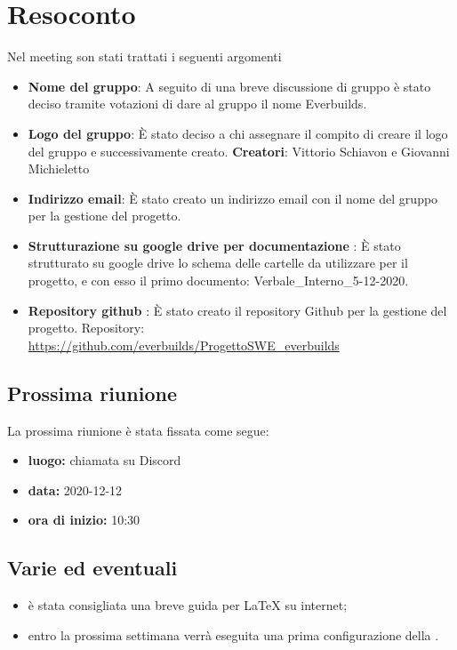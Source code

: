 \section{Resoconto}
Nel meeting son stati trattati i seguenti argomenti
	\begin{itemize}
		\item\textbf{Nome del gruppo}:
		A seguito di una breve discussione di gruppo è stato deciso tramite votazioni di dare al gruppo il nome Everbuilds.
		\item\textbf{Logo del gruppo}:
		È stato deciso a chi assegnare il compito di creare il logo del gruppo e successivamente creato.
		\textbf{Creatori}: Vittorio Schiavon e Giovanni Michieletto
		\item\textbf{ Indirizzo email}:
		È stato creato un indirizzo email con il nome del gruppo per la gestione del progetto.
		\item\textbf{ Strutturazione su google drive per documentazione }:
		È stato strutturato su google drive lo schema delle cartelle da utilizzare per il progetto, e con esso il primo documento: Verbale\_Interno\_5-12-2020.
		\item\textbf{ Repository github }:
		È stato creato il repository Github per la gestione del progetto.
		Repository: \url{https://github.com/everbuilds/ProgettoSWE_everbuilds}
	\end{itemize}

\subsection{Prossima riunione}
La prossima riunione è stata fissata come segue:
\begin{itemize}
	\item \textbf{luogo:} chiamata su Discord
	\item \textbf{data:} 2020-12-12
	\item \textbf{ora di inizio:} 10:30
\end{itemize}


\subsection{Varie ed eventuali}
\begin{itemize}

	\item è stata consigliata una breve guida per \LaTeX{} su internet;
	\item entro la prossima settimana verrà eseguita una prima configurazione della .
\end{itemize}


